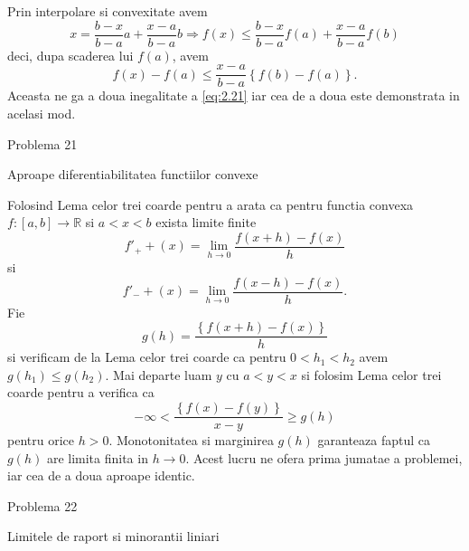 \documentclass[a4paper,12pt,oneside]{report}
\begin{document}
Prin interpolare si convexitate avem
\begin{displaymath}
    x = \frac{b - x}{b - a}a + \frac{x - a}{b - a }b \Rightarrow f\left ( x \right ) \leq \frac{b - x}{b - a}f\left ( a \right ) + \frac{x - a}{b - a }f\left ( b \right )
\end{displaymath}
 deci, dupa scaderea lui \(f\left ( a \right )\), avem
 \begin{displaymath}
     f\left ( x \right ) - f\left ( a \right )\leq \frac{x - a}{b - a }\left \{ f\left ( b \right ) - f\left ( a \right ) \right \}. \label{eq:2.22} \tag{2.22}
 \end{displaymath}
Aceasta ne ga a doua inegalitate a \ref{eq:2.21} iar cea de a doua este demonstrata in acelasi mod. 


Problema 21

Aproape diferentiabilitatea functiilor convexe 

Folosind Lema celor trei coarde pentru a arata ca pentru functia convexa \(f : \left [ a,b \right ]  \to \mathbb{R}\) si \(a< x< b\) exista limite finite
\begin{displaymath}
    {f}'_{+} + \left ( x \right ) = \lim_{h  \to 0}\frac{f\left ( x + h \right ) - f\left ( x \right )}{h} 
\end{displaymath}
si 
\begin{displaymath}
    {f}'_{-} + \left ( x \right ) = \lim_{h  \to 0}\frac{f\left ( x - h \right ) - f\left ( x \right )}{h}.
\end{displaymath}
Fie 
\begin{displaymath}
    g\left ( h \right ) = \frac{\left \{ f\left ( x + h \right ) - f\left ( x \right ) \right \}}{h}
\end{displaymath}
 si verificam de la Lema celor trei coarde ca pentru \(0 < h_{1} < h_{2}\) avem \(g\left ( h_{1} \right )\leq g\left ( h_{2} \right )\). Mai departe luam \(y\) cu \(a <  y < x \) si folosim Lema celor trei coarde pentru a verifica ca
 \begin{displaymath}
    -\infty < \frac{\left \{ f\left ( x \right ) - f\left ( y \right ) \right \}}{x - y}\geq g\left ( h \right )
 \end{displaymath}
 pentru orice \(h> 0\). Monotonitatea si marginirea \(g\left ( h \right )\) garanteaza faptul ca \(g\left ( h \right )\) are limita finita in \(h \to 0\). Acest lucru ne ofera prima jumatae a problemei, iar cea de a doua aproape identic. 

Problema 22

Limitele de raport si minorantii liniari 
\end{document}
